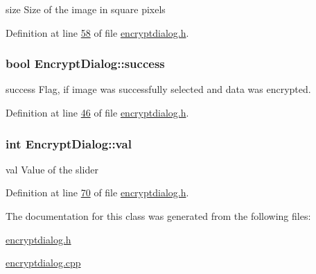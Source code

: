 size Size of the image in square pixels 



Definition at line \hyperlink{encryptdialog_8h_source_l00058}{58} of file \hyperlink{encryptdialog_8h_source}{encryptdialog.\+h}.

\subsubsection[{\texorpdfstring{success}{success}}]{\setlength{\rightskip}{0pt plus 5cm}bool Encrypt\+Dialog\+::success}\hypertarget{class_encrypt_dialog_ada4900bcd40894d9c098c65aa4066ac9}{}\label{class_encrypt_dialog_ada4900bcd40894d9c098c65aa4066ac9}


success Flag, if image was successfully selected and data was encrypted. 



Definition at line \hyperlink{encryptdialog_8h_source_l00046}{46} of file \hyperlink{encryptdialog_8h_source}{encryptdialog.\+h}.

\subsubsection[{\texorpdfstring{val}{val}}]{\setlength{\rightskip}{0pt plus 5cm}int Encrypt\+Dialog\+::val}\hypertarget{class_encrypt_dialog_a3c9da51b5e9d98d702bcc4ed15405fd5}{}\label{class_encrypt_dialog_a3c9da51b5e9d98d702bcc4ed15405fd5}


val Value of the slider 



Definition at line \hyperlink{encryptdialog_8h_source_l00070}{70} of file \hyperlink{encryptdialog_8h_source}{encryptdialog.\+h}.



The documentation for this class was generated from the following files\+:\begin{DoxyCompactItemize}
\item 
\hyperlink{encryptdialog_8h}{encryptdialog.\+h}\item 
\hyperlink{encryptdialog_8cpp}{encryptdialog.\+cpp}\end{DoxyCompactItemize}
